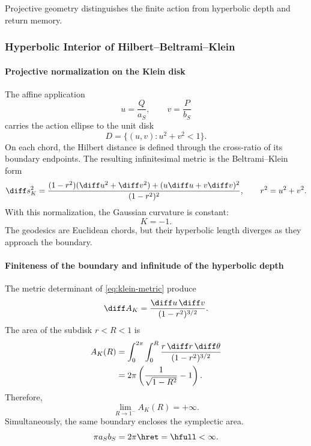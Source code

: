 \noindent Projective geometry distinguishes the finite action from hyperbolic depth and return memory.\par\medskip

\subsubsection{Hyperbolic Interior of Hilbert--Beltrami--Klein}

\paragraph{Projective normalization on the Klein disk}

The affine application
\[
u=\frac{Q}{a_S},\qquad v=\frac{P}{b_S}
\]
carries the action ellipse to the unit disk
\[
D=\{(u,v):u^2+v^2<1\}.
\]
On each chord, the Hilbert distance is defined through the cross-ratio
of its boundary endpoints. The resulting infinitesimal metric is the
Beltrami--Klein form
\begin{equation}
\diff s_K^2=
\frac{(1-r^2)(\diff u^2+\diff v^2)+(u\diff u+v\diff v)^2}
{(1-r^2)^2},
\qquad r^2=u^2+v^2.
\label{eq:klein-metric}
\end{equation}
With this normalization, the Gaussian curvature is constant:
\begin{equation}
K=-1.
\label{eq:klein-curvature}
\end{equation}
The geodesics are Euclidean chords, but their hyperbolic length diverges as
they approach the boundary.

\paragraph{Finiteness of the boundary and infinitude of the hyperbolic depth}

The metric determinant of \eqref{eq:klein-metric} produce
\begin{equation}
\diff A_K=\frac{\diff u\,\diff v}{(1-r^2)^{3/2}}.
\label{eq:klein-area-density}
\end{equation}
The area of the subdisk \(r<R<1\) is
\begin{align}
A_K(R)
&=\int_0^{2\pi}\int_0^R
\frac{r\,\diff r\,\diff\theta}{(1-r^2)^{3/2}}\\
&=2\pi\left(\frac1{\sqrt{1-R^2}}-1\right).
\label{eq:klein-area-R}
\end{align}
Therefore,
\[
\lim_{R\to1^-}A_K(R)=+\infty.
\]
Simultaneously, the same boundary encloses the symplectic area.
\[
\pi a_Sb_S=2\pi\hret=\hfull<\infty.
\]

